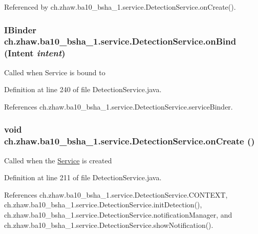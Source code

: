 Referenced by ch.zhaw.ba10\_\-bsha\_\-1.service.DetectionService.onCreate().\hypertarget{classch_1_1zhaw_1_1ba10__bsha__1_1_1service_1_1DetectionService_a4f03a6b3f16d1dfa20dafc02952681da}{
\subsubsection[{onBind}]{\setlength{\rightskip}{0pt plus 5cm}IBinder ch.zhaw.ba10\_\-bsha\_\-1.service.DetectionService.onBind (Intent {\em intent})}}
\label{classch_1_1zhaw_1_1ba10__bsha__1_1_1service_1_1DetectionService_a4f03a6b3f16d1dfa20dafc02952681da}
Called when Service is bound to 

Definition at line 240 of file DetectionService.java.

References ch.zhaw.ba10\_\-bsha\_\-1.service.DetectionService.serviceBinder.\hypertarget{classch_1_1zhaw_1_1ba10__bsha__1_1_1service_1_1DetectionService_a78b14ab8beb6bafa58ed1eb4c601d8a6}{
\subsubsection[{onCreate}]{\setlength{\rightskip}{0pt plus 5cm}void ch.zhaw.ba10\_\-bsha\_\-1.service.DetectionService.onCreate ()}}
\label{classch_1_1zhaw_1_1ba10__bsha__1_1_1service_1_1DetectionService_a78b14ab8beb6bafa58ed1eb4c601d8a6}
Called when the \hyperlink{}{Service} is created 

Definition at line 211 of file DetectionService.java.

References ch.zhaw.ba10\_\-bsha\_\-1.service.DetectionService.CONTEXT, ch.zhaw.ba10\_\-bsha\_\-1.service.DetectionService.initDetection(), ch.zhaw.ba10\_\-bsha\_\-1.service.DetectionService.notificationManager, and ch.zhaw.ba10\_\-bsha\_\-1.service.DetectionService.showNotification().

